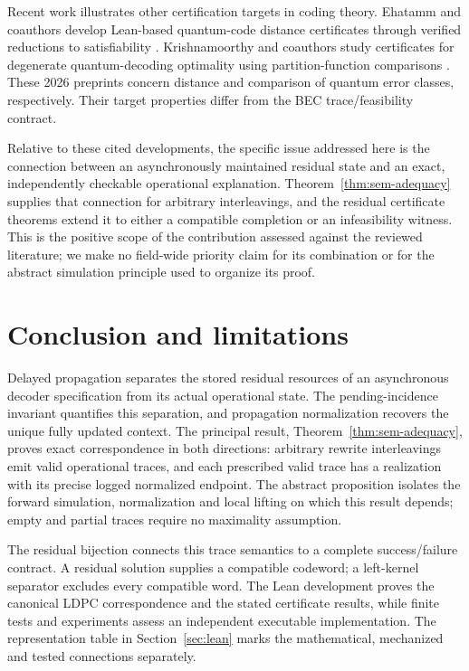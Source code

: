 \documentclass{lmcs}
\begin{document}
Recent work illustrates other certification targets in coding theory.
Ehatamm and coauthors develop Lean-based quantum-code distance
certificates through verified reductions to satisfiability
\cite{EhatammEtAl2026LeanQEC}. Krishnamoorthy and coauthors study
certificates for degenerate quantum-decoding optimality using
partition-function comparisons \cite{KrishnamoorthyEtAl2026CertifiedQ}.
These 2026 preprints concern distance and comparison of quantum error
classes, respectively. Their target properties differ from the BEC
trace/feasibility contract.

Relative to these cited developments, the specific issue addressed here
is the connection between an asynchronously maintained residual state
and an exact, independently checkable operational explanation.
Theorem~\ref{thm:sem-adequacy} supplies that connection for arbitrary
interleavings, and the residual certificate theorems extend it to either
a compatible completion or an infeasibility witness. This is the positive
scope of the contribution assessed against the reviewed literature;
we make no field-wide priority claim for its combination or for the
abstract simulation principle used to organize its proof.

\section{Conclusion and limitations}\label{sec:limitations}
Delayed propagation separates the stored residual resources of an
asynchronous decoder specification from its actual operational state.
The pending-incidence invariant quantifies this separation, and
propagation normalization recovers the unique fully updated context.
The principal result, Theorem~\ref{thm:sem-adequacy}, proves exact
correspondence in both directions: arbitrary rewrite interleavings emit
valid operational traces, and each prescribed valid trace has a realization
with its precise logged normalized endpoint. The abstract proposition
isolates the forward simulation, normalization and local lifting on which
this result depends; empty and partial traces require no maximality
assumption.

The residual bijection connects this trace semantics to a complete
success/failure contract. A residual solution supplies a compatible
codeword; a left-kernel separator excludes every compatible word.
The Lean development proves the canonical LDPC correspondence and the
stated certificate results, while finite tests and experiments assess
an independent executable implementation. The representation table in
Section~\ref{sec:lean} marks the mathematical, mechanized and tested
connections separately.
\end{document}
